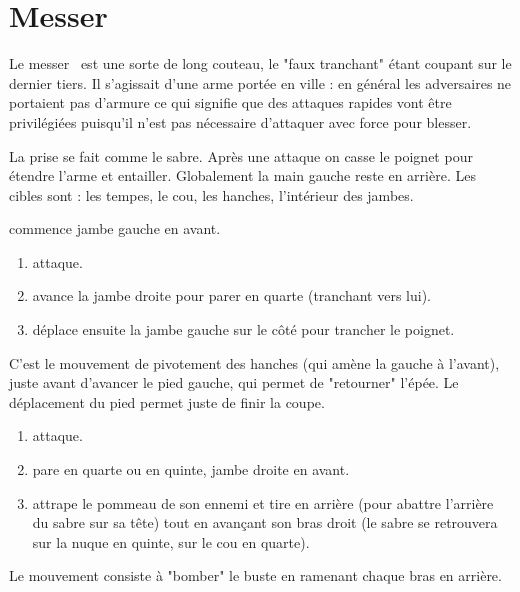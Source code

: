 \chapter{Messer}


Le messer~\footnotemark{} est une sorte de long couteau, le "faux tranchant" étant coupant sur le dernier tiers.
Il s'agissait d'une arme portée en ville : en général les adversaires ne portaient pas d'armure ce qui signifie que des attaques rapides vont être privilégiées puisqu'il n'est pas nécessaire d'attaquer avec force pour blesser.

La prise se fait comme le sabre.
Après une attaque on casse le poignet pour étendre l'arme et entailler.
Globalement la main gauche reste en arrière.
Les cibles sont : les tempes, le cou, les hanches, l'intérieur des jambes.


\begin{technique}

\D commence jambe gauche en avant.

\begin{enumerate}
	\item \A attaque.
	
	\item \D avance la jambe droite pour parer en quarte (tranchant vers lui).
	
	\item \D déplace ensuite la jambe gauche sur le côté pour trancher le poignet.
\end{enumerate}

C'est le mouvement de pivotement des hanches (qui amène la gauche à l'avant), juste avant d'avancer le pied gauche, qui permet de "retourner" l'épée.
Le déplacement du pied permet juste de finir la coupe.
\end{technique}


\begin{technique}

\begin{enumerate}
	\item \A attaque.
	
	\item \D pare en quarte ou en quinte, jambe droite en avant.
	
	\item \D attrape le pommeau de son ennemi et tire en arrière (pour abattre l'arrière du sabre sur sa tête) tout en avançant son bras droit (le sabre se retrouvera sur la nuque en quinte, sur le cou en quarte).
\end{enumerate}

Le mouvement consiste à "bomber" le buste en ramenant chaque bras en arrière.
\end{technique}


